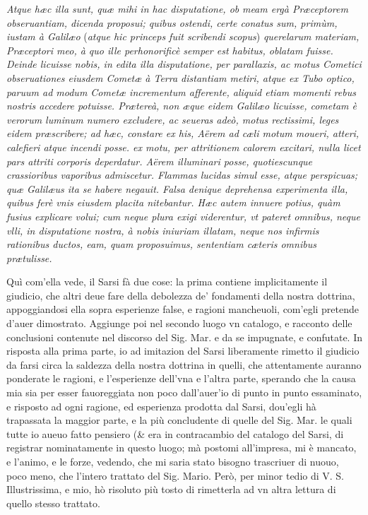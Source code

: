 \documentclass[11pt,twoside,openany]{book}
\begin{document}
\textit{Atque hæc illa sunt, quæ mihi in hac disputatione, ob }\textit{meam ergà Præceptorem obseruantiam, dicenda proposui; quibus ostendi, certe conatus sum, primùm, iustam à Galilæo }(\textit{atque hic princeps fuit scribendi scopus})\textit{ querelarum materiam, Præceptori meo, à quo ille perhonorificè semper est habitus, oblatam fuisse. Deinde licuisse nobis, in edita illa disputatione, per parallaxis, ac motus Cometici obseruationes eiusdem Cometæ à Terra distantiam metiri, atque ex Tubo optico, paruum ad modum Cometæ incrementum afferente, aliquid etiam momenti rebus nostris accedere potuisse. Prætereà, non æque eidem Galilæo licuisse, cometam è verorum luminum numero excludere, ac seueras adeò, motus rectissimi, leges eidem præscribere; ad hæc, constare ex his, Aërem ad cæli motum moueri, atteri, calefieri atque incendi posse. ex motu, per attritionem calorem excitari, nulla licet pars attriti corporis deperdatur. Aërem illuminari posse, quotiescunque crassioribus vaporibus admiscetur. Flammas lucidas simul esse, atque perspicuas; quæ Galilæus ita se habere negauit. Falsa denique deprehensa experimenta illa, quibus ferè vnis eiusdem placita nitebantur. Hæc autem innuere }\textit{potius, quàm fusius explicare volui; cum neque plura exigi viderentur, vt pateret omnibus, neque vlli, in disputatione nostra, à nobis iniuriam illatam, neque nos infirmis rationibus ductos, eam, quam proposuimus, sententiam cæteris omnibus prætulisse.}


Quì com'ella vede, il Sarsi fà due cose: la prima contiene implicitamente il giudicio, che altri deue fare della debolezza de' fondamenti della nostra dottrina, appoggiandosi ella sopra esperienze false, e ragioni mancheuoli, com'egli pretende d'auer dimostrato. Aggiunge poi nel secondo luogo vn catalogo, e racconto delle conclusioni contenute nel discorso del Sig. Mar. e da se impugnate, e confutate. In risposta alla prima parte, io ad imitazion del Sarsi liberamente rimetto il giudicio da farsi circa la saldezza della nostra dottrina in quelli, che attentamente auranno ponderate le ragioni, e l'esperienze dell'vna e l'altra parte, sperando che la causa mia sia per esser fauoreggiata non poco dall'auer'io di punto in punto essaminato, e risposto ad ogni ragione, ed esperienza prodotta dal Sarsi, dou'egli hà trapassata la maggior parte, e la più concludente di quelle del Sig. Mar. le quali tutte io aueuo fatto pensiero (\& era in contracambio del catalogo del Sarsi, di registrar nominatamente in questo luogo; mà postomi all'impresa, mi è mancato, e l'animo, e le forze, vedendo, che mi saria stato bisogno trascriuer di nuouo, poco meno, che l'intero trattato del Sig. Mario. Però, per minor tedio di V. S. Illustrissima, e mio, hò risoluto più tosto di rimetterla ad vn altra lettura di quello stesso trattato.
\end{document}

